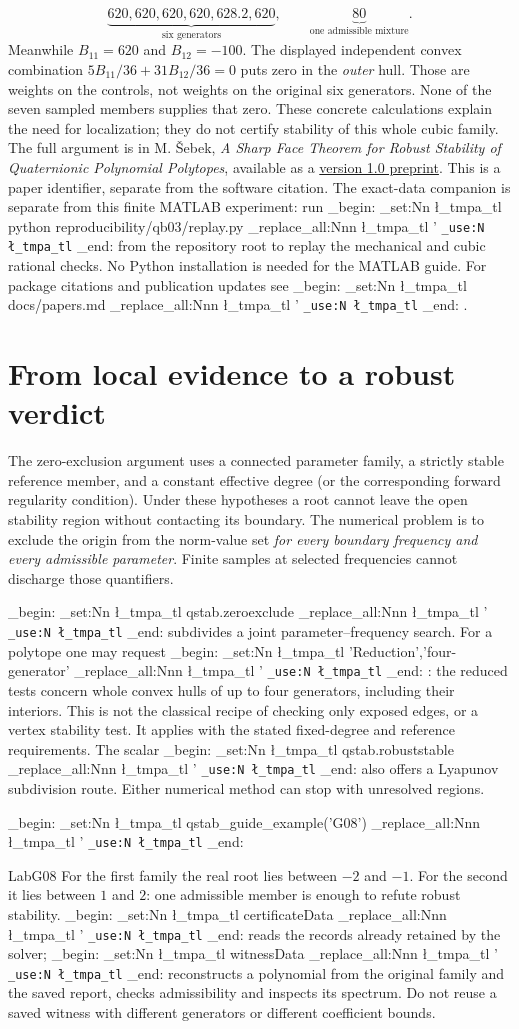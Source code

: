 \documentclass[11pt,a4paper]{article}
\newcommand{\m}[1]{
  \group_begin:
  \tl_set:Nn \l_tmpa_tl {#1}
  \tl_replace_all:Nnn \l_tmpa_tl {'}{\textquotesingle{}}
  \texttt{\tl_use:N \l_tmpa_tl}
  \group_end:
}
\newcommand{\lead}[1]{\par\smallskip\noindent{\sffamily\bfseries\color{teal}#1}\enspace}
\newcommand{\topic}[2]{\clearpage\section{#1}\label{#2}}
\newcommand{\lab}[1]{\lead{Executable example #1}\m{qstab\_guide\_example('#1')}\par\csname Lab#1\endcsname}
\begin{document}
\[
 \underbrace{620,620,620,620,628.2,620}_{\text{six generators}},\qquad
 \underbrace{80}_{\text{one admissible mixture}}.
\]
Meanwhile $B_{11}=620$ and $B_{12}=-100$. The displayed independent convex combination $5B_{11}/36+31B_{12}/36=0$ puts zero in the \emph{outer} hull. Those are weights on the controls, not weights on the original six generators. None of the seven sampled members supplies that zero. These concrete calculations explain the need for localization; they do not certify stability of this whole cubic family. The full argument is in M. Šebek, \emph{A Sharp Face Theorem for Robust Stability of Quaternionic Polynomial Polytopes}, available as a \href{https://doi.org/10.5281/zenodo.24136448}{version 1.0 preprint}. This is a paper identifier, separate from the software citation. The exact-data companion is separate from this finite MATLAB experiment: run \m{python reproducibility/qb03/replay.py} from the repository root to replay the mechanical and cubic rational checks. No Python installation is needed for the MATLAB guide. For package citations and publication updates see \m{docs/papers.md}.
\topic{From local evidence to a robust verdict}{sec:cert}
The zero-exclusion argument uses a connected parameter family, a strictly stable reference member, and a constant effective degree (or the corresponding forward regularity condition). Under these hypotheses a root cannot leave the open stability region without contacting its boundary. The numerical problem is to exclude the origin from the norm-value set \emph{for every boundary frequency and every admissible parameter}. Finite samples at selected frequencies cannot discharge those quantifiers.
\lead{Choose a computational route} \m{qstab.zeroexclude} subdivides a joint parameter--frequency search. For a polytope one may request \m{'Reduction','four-generator'}: the reduced tests concern whole convex hulls of up to four generators, including their interiors. This is not the classical recipe of checking only exposed edges, or a vertex stability test. It applies with the stated fixed-degree and reference requirements. The scalar \m{qstab.robuststable} also offers a Lyapunov subdivision route. Either numerical method can stop with unresolved regions.
\lab{G08}
For the first family the real root lies between $-2$ and $-1$. For the second it lies between $1$ and $2$: one admissible member is enough to refute robust stability. \m{certificateData} reads the records already retained by the solver; \m{witnessData} reconstructs a polynomial from the original family and the saved report, checks admissibility and inspects its spectrum. Do not reuse a saved witness with different generators or different coefficient bounds.
\end{document}
